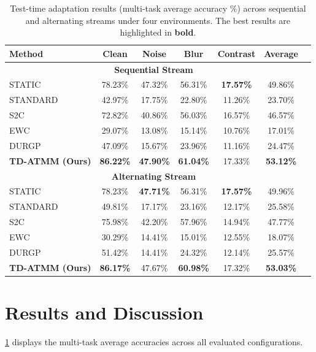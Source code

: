 \documentclass{article}
\theoremstyle{plain}
\theoremstyle{definition}
\theoremstyle{remark}
\begin{document}
\begin{table}[t]
\caption{Test-time adaptation results (multi-task average accuracy \%) across sequential and alternating streams under four environments. The best results are highlighted in \textbf{bold}.}
\label{table:results}
\vskip 0.15in
\begin{center}
\begin{small}
\begin{sc}
\begin{tabular}{lcccccr}
\toprule
Method & Clean & Noise & Blur & Contrast & Average \\
\midrule
\multicolumn{6}{c}{\textbf{Sequential Stream}} \\
\midrule
STATIC   & 78.23\% & 47.32\% & 56.31\% & \textbf{17.57\%} & 49.86\% \\
STANDARD & 42.97\% & 17.75\% & 22.80\% & 11.26\% & 23.70\% \\
S2C      & 72.82\% & 40.86\% & 56.03\% & 16.57\% & 46.57\% \\
EWC      & 29.07\% & 13.08\% & 15.14\% & 10.76\% & 17.01\% \\
DURGP    & 47.09\% & 15.67\% & 23.96\% & 11.16\% & 24.47\% \\
\textbf{TD-ATMM (Ours)} & \textbf{86.22\%} & \textbf{47.90\%} & \textbf{61.04\%} & 17.33\% & \textbf{53.12\%} \\
\midrule
\multicolumn{6}{c}{\textbf{Alternating Stream}} \\
\midrule
STATIC   & 78.23\% & \textbf{47.71\%} & 56.31\% & \textbf{17.57\%} & 49.96\% \\
STANDARD & 49.81\% & 17.17\% & 23.16\% & 12.17\% & 25.58\% \\
S2C      & 75.98\% & 42.20\% & 57.96\% & 14.94\% & 47.77\% \\
EWC      & 30.29\% & 14.41\% & 15.01\% & 12.55\% & 18.07\% \\
DURGP    & 51.42\% & 14.41\% & 24.32\% & 12.14\% & 25.57\% \\
\textbf{TD-ATMM (Ours)} & \textbf{86.17\%} & 47.67\% & \textbf{60.98\%} & 17.32\% & \textbf{53.03\%} \\
\bottomrule
\end{tabular}
\end{sc}
\end{small}
\end{center}
\vskip -0.1in
\end{table}

\section{Results and Discussion}
\cref{table:results} displays the multi-task average accuracies across all evaluated configurations.
\end{document}
